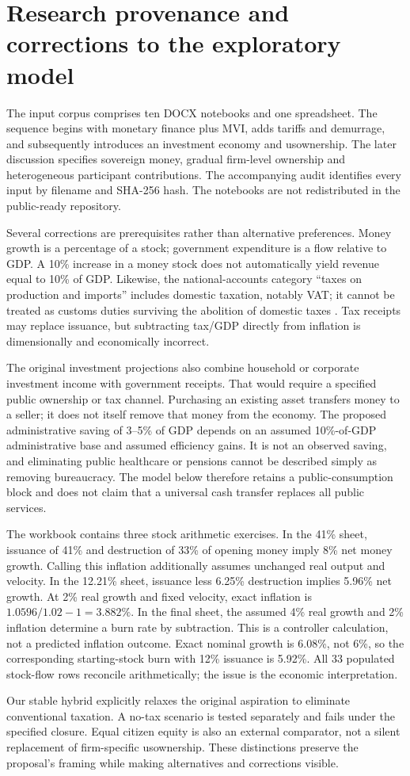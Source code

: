 \section{Research provenance and corrections to the exploratory model}
The input corpus comprises ten DOCX notebooks and one spreadsheet. The sequence begins with monetary finance plus MVI, adds tariffs and demurrage, and subsequently introduces an investment economy and usownership. The later discussion specifies sovereign money, gradual firm-level ownership and heterogeneous participant contributions. The accompanying audit identifies every input by filename and SHA-256 hash. The notebooks are not redistributed in the public-ready repository.

Several corrections are prerequisites rather than alternative preferences. Money growth is a percentage of a stock; government expenditure is a flow relative to GDP. A 10\% increase in a money stock does not automatically yield revenue equal to 10\% of GDP. Likewise, the national-accounts category ``taxes on production and imports'' includes domestic taxation, notably VAT; it cannot be treated as customs duties surviving the abolition of domestic taxes \citep{esamethod}. Tax receipts may replace issuance, but subtracting tax/GDP directly from inflation is dimensionally and economically incorrect.

The original investment projections also combine household or corporate investment income with government receipts. That would require a specified public ownership or tax channel. Purchasing an existing asset transfers money to a seller; it does not itself remove that money from the economy. The proposed administrative saving of 3--5\% of GDP depends on an assumed 10\%-of-GDP administrative base and assumed efficiency gains. It is not an observed saving, and eliminating public healthcare or pensions cannot be described simply as removing bureaucracy. The model below therefore retains a public-consumption block and does not claim that a universal cash transfer replaces all public services.

The workbook contains three stock arithmetic exercises. In the 41\% sheet, issuance of 41\% and destruction of 33\% of opening money imply 8\% net money growth. Calling this inflation additionally assumes unchanged real output and velocity. In the 12.21\% sheet, issuance less 6.25\% destruction implies 5.96\% net growth. At 2\% real growth and fixed velocity, exact inflation is $1.0596/1.02-1=3.882\%$. In the final sheet, the assumed 4\% real growth and 2\% inflation determine a burn rate by subtraction. This is a controller calculation, not a predicted inflation outcome. Exact nominal growth is 6.08\%, not 6\%, so the corresponding starting-stock burn with 12\% issuance is 5.92\%. All 33 populated stock-flow rows reconcile arithmetically; the issue is the economic interpretation.

Our stable hybrid explicitly relaxes the original aspiration to eliminate conventional taxation. A no-tax scenario is tested separately and fails under the specified closure. Equal citizen equity is also an external comparator, not a silent replacement of firm-specific usownership. These distinctions preserve the proposal's framing while making alternatives and corrections visible.

